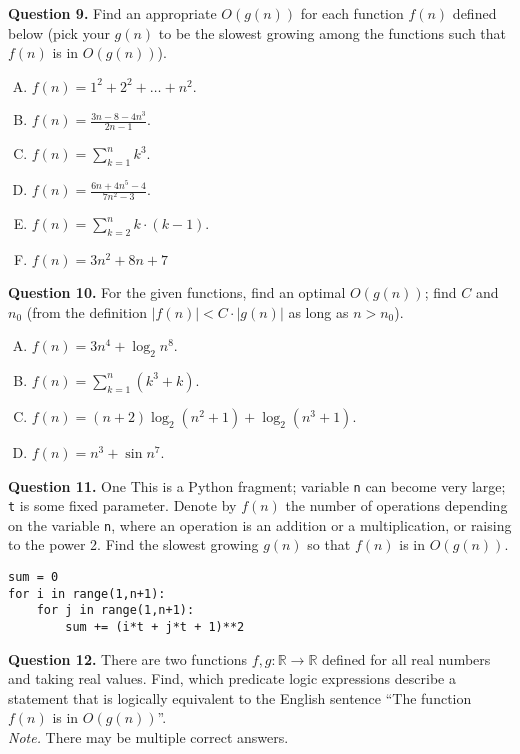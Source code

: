 \documentclass[jou]{apa6}
\begin{document}
{\vspace{6pt}
{\bf Question 9.} Find an appropriate $O(g(n))$ for each function $f(n)$ defined below 
(pick your $g(n)$ to be the slowest growing among the functions such that $f(n)$ is in $O(g(n))$). 
\begin{enumerate}[(A)]
\item $f(n) = 1^2 + 2^2 + \ldots + n^2$.
\item ${\displaystyle f(n) = \frac{3n - 8 - 4n^3}{2n - 1}}$. 
\item ${\displaystyle f(n) = \sum\limits_{k=1}^{n} k^3}$.
\item ${\displaystyle f(n) = \frac{6n + 4n^5 - 4}{7n^2 - 3}}$. 
\item ${\displaystyle f(n) = \sum\limits_{k=2}^{n} k\cdot(k-1)}$.
\item ${\displaystyle f(n) = 3n^2 + 8n + 7}$
\end{enumerate}

\vspace{6pt}
{\bf Question 10.}
For the given functions, find an optimal $O(g(n))$; find
$C$ and $n_0$ (from the definition $|f(n)| < C\cdot |g(n)|$ as long as $n > n_0$). 
\begin{enumerate}[(A)]
\item ${\displaystyle f(n) = 3n^4 + \log_2 n^8}$. 
\item ${\displaystyle f(n) = \sum\limits_{k=1}^{n} (k^3 + k)}$.
\item ${\displaystyle f(n) = (n + 2)\log_2 (n^2 + 1) + \log_2 (n^3 + 1)}$.
\item ${\displaystyle f(n) = n^3 + \sin n^7}$.
\end{enumerate}


\vspace{6pt}
{\bf Question 11.} One  This is a Python fragment; variable {\tt n} can become very large; {\tt t} is some
fixed parameter. Denote by $f(n)$ the number of operations depending on the variable {\tt n}, 
where an operation is an addition or a multiplication, or raising to the power 2.
Find the slowest growing $g(n)$ so that $f(n)$ is in $O(g(n))$. 
\begin{verbatim}
sum = 0
for i in range(1,n+1):
    for j in range(1,n+1):
        sum += (i*t + j*t + 1)**2
\end{verbatim}

\vspace{6pt}
{\bf Question 12.} There are two functions $f,g: \mathbb{R} \rightarrow \mathbb{R}$ defined
for all real numbers and taking real values.
Find, which predicate logic expressions describe a statement that is logically
equivalent to the English sentence ``The function $f(n)$ is in $O(g(n))$''.\\
{\em Note.} There may be multiple correct answers. 

}
\end{document}
